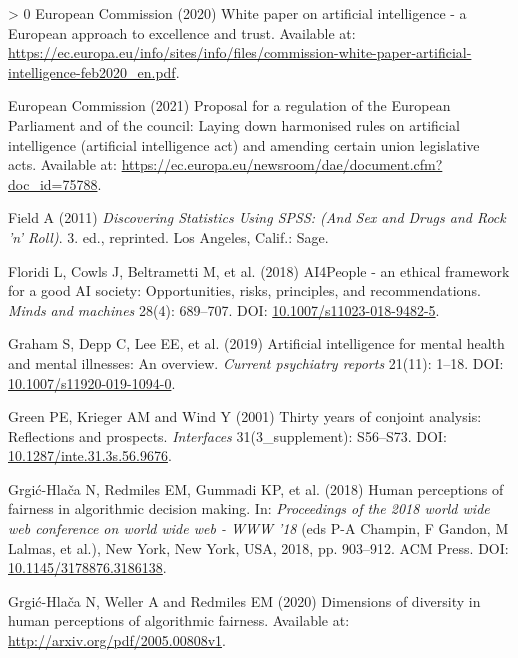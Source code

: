 \documentclass{article}
\newlength{\cslhangindent}
\newenvironment{CSLReferences}[3] %
 {%
  \setlength{\parindent}{0pt}
  \ifodd #1 \everypar{\setlength{\hangindent}{\cslhangindent}}\ignorespaces\fi
  \ifnum #2 > 0
  \setlength{\parskip}{#2\baselineskip}
  \fi
 }%
 {}
\begin{document}
\begin{CSLReferences}{1}{0}
\leavevmode\hypertarget{ref-EuropeanCommission.2020}{}%
European Commission (2020) White paper on artificial intelligence - a
European approach to excellence and trust. Available at:
\url{https://ec.europa.eu/info/sites/info/files/commission-white-paper-artificial-intelligence-feb2020_en.pdf}.

\leavevmode\hypertarget{ref-EuropeanCommission.2021}{}%
European Commission (2021) Proposal for a regulation of the European
Parliament and of the council: Laying down harmonised rules on
artificial intelligence (artificial intelligence act) and amending
certain union legislative acts. Available at:
\url{https://ec.europa.eu/newsroom/dae/document.cfm?doc_id=75788}.

\leavevmode\hypertarget{ref-Field.2011}{}%
Field A (2011) \emph{Discovering Statistics Using SPSS: (And Sex and
Drugs and Rock 'n' Roll)}. 3. ed., reprinted. Los Angeles, Calif.: Sage.

\leavevmode\hypertarget{ref-Floridi.2018}{}%
Floridi L, Cowls J, Beltrametti M, et al. (2018) AI4People - an ethical
framework for a good AI society: Opportunities, risks, principles, and
recommendations. \emph{Minds and machines} 28(4): 689--707. DOI:
\href{https://doi.org/10.1007/s11023-018-9482-5}{10.1007/s11023-018-9482-5}.

\leavevmode\hypertarget{ref-Graham.2019}{}%
Graham S, Depp C, Lee EE, et al. (2019) Artificial intelligence for
mental health and mental illnesses: An overview. \emph{Current
psychiatry reports} 21(11): 1--18. DOI:
\href{https://doi.org/10.1007/s11920-019-1094-0}{10.1007/s11920-019-1094-0}.

\leavevmode\hypertarget{ref-Green.2001}{}%
Green PE, Krieger AM and Wind Y (2001) Thirty years of conjoint
analysis: Reflections and prospects. \emph{Interfaces}
31(3{\_}supplement): S56--S73. DOI:
\href{https://doi.org/10.1287/inte.31.3s.56.9676}{10.1287/inte.31.3s.56.9676}.

\leavevmode\hypertarget{ref-GrgicHlaca.2018}{}%
Grgić-Hlača N, Redmiles EM, Gummadi KP, et al. (2018) Human perceptions
of fairness in algorithmic decision making. In: \emph{Proceedings of the
2018 world wide web conference on world wide web - WWW '18} (eds P-A
Champin, F Gandon, M Lalmas, et al.), New York, New York, USA, 2018, pp.
903--912. {ACM Press}. DOI:
\href{https://doi.org/10.1145/3178876.3186138}{10.1145/3178876.3186138}.

\leavevmode\hypertarget{ref-GrgicHlaca.2020}{}%
Grgić-Hlača N, Weller A and Redmiles EM (2020) Dimensions of diversity
in human perceptions of algorithmic fairness. Available at:
\url{http://arxiv.org/pdf/2005.00808v1}.


\end{CSLReferences}
\end{document}
